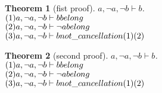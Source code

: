 \documentclass[11pt]{article}
\newtheorem{theorem}{Theorem}
\def\turn{\vdash}
\begin{document}
\begin{theorem}[fist proof] $ a, \neg a, \neg b \turn b $.\\
$(1)a, \neg a, \neg b \turn b \hfill belong $\\
$(2)a, \neg a, \neg b \turn \neg a \hfill belong $\\
$(3)a, \neg a, \neg b \turn b \hfill not \_ cancellation (1)(2) $\\
\end{theorem}
\begin{theorem}[second proof] $ a, \neg a, \neg b \turn b $.\\
$(1)a, \neg a, \neg b \turn b \hfill belong $\\
$(2)a, \neg a, \neg b \turn \neg a \hfill belong $\\
$(3)a, \neg a, \neg b \turn b \hfill not \_ cancellation (1)(2) $\\
\end{theorem}
\end{document}
